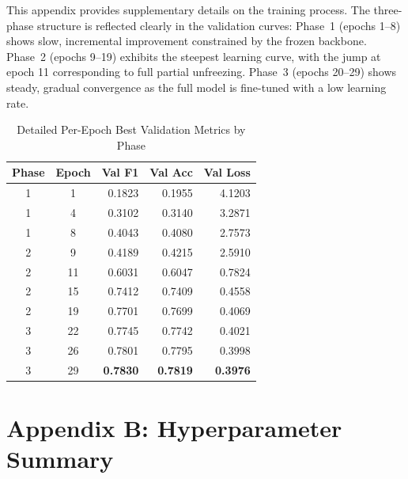 \documentclass[12pt,a4paper]{article}
\begin{document}
This appendix provides supplementary details on the training process. The three-phase structure is reflected clearly in the validation curves: Phase~1 (epochs 1--8) shows slow, incremental improvement constrained by the frozen backbone. Phase~2 (epochs 9--19) exhibits the steepest learning curve, with the jump at epoch 11 corresponding to full partial unfreezing. Phase~3 (epochs 20--29) shows steady, gradual convergence as the full model is fine-tuned with a low learning rate.

\begin{table}[H]
\centering
\caption{Detailed Per-Epoch Best Validation Metrics by Phase}
\label{tab:epoch_detail}
\begin{tabular}{|c|c|r|r|r|}
    \hline
    \textbf{Phase} & \textbf{Epoch} & \textbf{Val F1} & \textbf{Val Acc} & \textbf{Val Loss} \\
    \hline
    1 & 1  & 0.1823 & 0.1955 & 4.1203 \\
    1 & 4  & 0.3102 & 0.3140 & 3.2871 \\
    1 & 8  & 0.4043 & 0.4080 & 2.7573 \\
    \hline
    2 & 9  & 0.4189 & 0.4215 & 2.5910 \\
    2 & 11 & 0.6031 & 0.6047 & 0.7824 \\
    2 & 15 & 0.7412 & 0.7409 & 0.4558 \\
    2 & 19 & 0.7701 & 0.7699 & 0.4069 \\
    \hline
    3 & 22 & 0.7745 & 0.7742 & 0.4021 \\
    3 & 26 & 0.7801 & 0.7795 & 0.3998 \\
    3 & 29 & \textbf{0.7830} & \textbf{0.7819} & \textbf{0.3976} \\
    \hline
\end{tabular}
\end{table}

\section*{Appendix B: Hyperparameter Summary}
\end{document}
